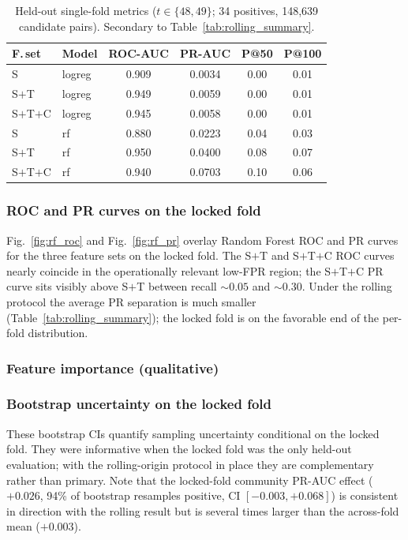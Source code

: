 \begin{table}[t]
\caption{Held-out single-fold metrics ($t \in \{48, 49\}$;
34 positives, 148{,}639 candidate pairs). Secondary to
Table~\ref{tab:rolling_summary}.}
\label{tab:test_metrics}
\centering
\begin{tabular}{llcccc}
\toprule
F.\,set & Model & ROC-AUC & PR-AUC & P@50 & P@100 \\
\midrule
S      & logreg & 0.909 & 0.0034 & 0.00 & 0.01 \\
S$+$T   & logreg & 0.949 & 0.0059 & 0.00 & 0.01 \\
S$+$T$+$C & logreg & 0.945 & 0.0058 & 0.00 & 0.01 \\
\addlinespace
S      & rf     & 0.880 & 0.0223 & 0.04 & 0.03 \\
S$+$T   & rf     & 0.950 & 0.0400 & 0.08 & 0.07 \\
S$+$T$+$C & rf     & 0.940 & 0.0703 & 0.10 & 0.06 \\
\bottomrule
\end{tabular}
\end{table}

\subsubsection{ROC and PR curves on the locked fold}
Fig.~\ref{fig:rf_roc} and Fig.~\ref{fig:rf_pr} overlay Random Forest
ROC and PR curves for the three feature sets on the locked fold. The
S$+$T and S$+$T$+$C ROC curves nearly coincide in the operationally
relevant low-FPR region; the S$+$T$+$C PR curve sits visibly above
S$+$T between recall $\sim 0.05$ and $\sim 0.30$. Under the rolling
protocol the average PR separation is much smaller
(Table~\ref{tab:rolling_summary}); the locked fold is on the
favorable end of the per-fold distribution.

\subsubsection{Feature importance (qualitative)}

\subsubsection{Bootstrap uncertainty on the locked fold}
\label{sec:results:bootstrap}
These bootstrap CIs quantify sampling uncertainty conditional on the
locked fold. They were informative when the locked fold was the only
held-out evaluation; with the rolling-origin protocol in place they
are complementary rather than primary. Note that the locked-fold
community PR-AUC effect ($+0.026$, 94\% of bootstrap resamples
positive, CI $[-0.003, +0.068]$) is consistent in direction with the
rolling result but is several times larger than the across-fold mean
($+0.003$).

